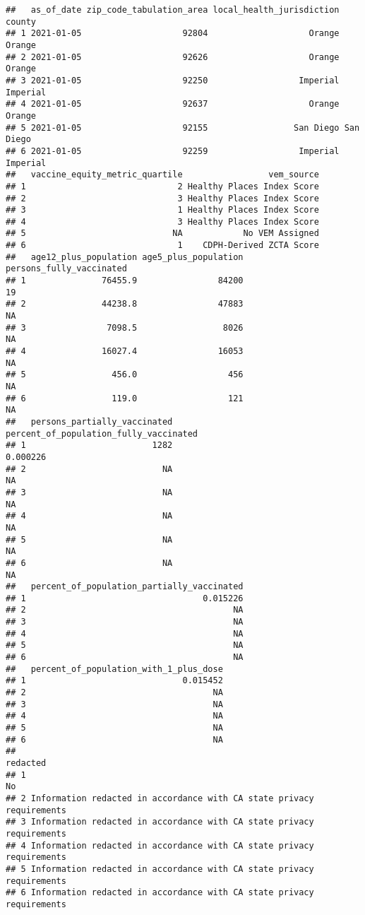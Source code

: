 \documentclass[
]{article}
\begin{document}
\begin{verbatim}
##   as_of_date zip_code_tabulation_area local_health_jurisdiction    county
## 1 2021-01-05                    92804                    Orange    Orange
## 2 2021-01-05                    92626                    Orange    Orange
## 3 2021-01-05                    92250                  Imperial  Imperial
## 4 2021-01-05                    92637                    Orange    Orange
## 5 2021-01-05                    92155                 San Diego San Diego
## 6 2021-01-05                    92259                  Imperial  Imperial
##   vaccine_equity_metric_quartile                 vem_source
## 1                              2 Healthy Places Index Score
## 2                              3 Healthy Places Index Score
## 3                              1 Healthy Places Index Score
## 4                              3 Healthy Places Index Score
## 5                             NA            No VEM Assigned
## 6                              1    CDPH-Derived ZCTA Score
##   age12_plus_population age5_plus_population persons_fully_vaccinated
## 1               76455.9                84200                       19
## 2               44238.8                47883                       NA
## 3                7098.5                 8026                       NA
## 4               16027.4                16053                       NA
## 5                 456.0                  456                       NA
## 6                 119.0                  121                       NA
##   persons_partially_vaccinated percent_of_population_fully_vaccinated
## 1                         1282                               0.000226
## 2                           NA                                     NA
## 3                           NA                                     NA
## 4                           NA                                     NA
## 5                           NA                                     NA
## 6                           NA                                     NA
##   percent_of_population_partially_vaccinated
## 1                                   0.015226
## 2                                         NA
## 3                                         NA
## 4                                         NA
## 5                                         NA
## 6                                         NA
##   percent_of_population_with_1_plus_dose
## 1                               0.015452
## 2                                     NA
## 3                                     NA
## 4                                     NA
## 5                                     NA
## 6                                     NA
##                                                                redacted
## 1                                                                    No
## 2 Information redacted in accordance with CA state privacy requirements
## 3 Information redacted in accordance with CA state privacy requirements
## 4 Information redacted in accordance with CA state privacy requirements
## 5 Information redacted in accordance with CA state privacy requirements
## 6 Information redacted in accordance with CA state privacy requirements
\end{verbatim}
\end{document}
